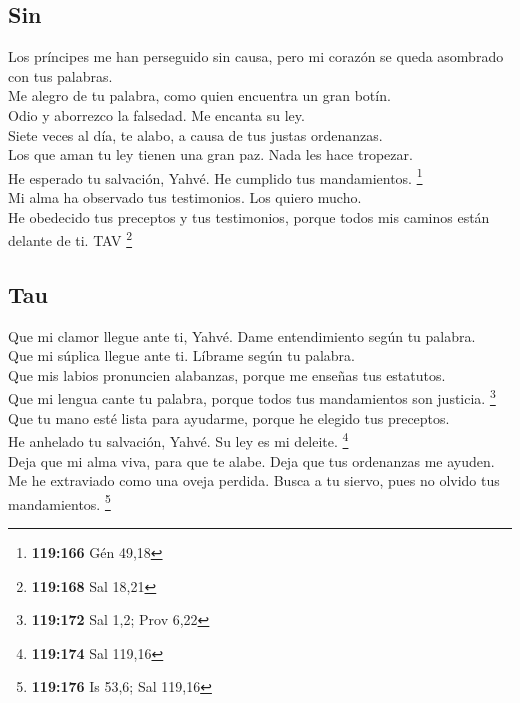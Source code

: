 \hypertarget{sin}{%
\subsection{Sin}\label{sin}}

 Los príncipes me han perseguido sin causa, pero mi
corazón se queda asombrado con tus palabras.\\
 Me alegro de tu palabra, como quien encuentra un gran
botín.\\
 Odio y aborrezco la falsedad. Me encanta su ley.\\
 Siete veces al día, te alabo, a causa de tus justas
ordenanzas.\\
 Los que aman tu ley tienen una gran paz. Nada les hace
tropezar.\\
 He esperado tu salvación, Yahvé. He cumplido tus
mandamientos. \footnote{\textbf{119:166} Gén 49,18}\\
 Mi alma ha observado tus testimonios. Los quiero
mucho.\\
 He obedecido tus preceptos y tus testimonios, porque
todos mis caminos están delante de ti. TAV \footnote{\textbf{119:168}
  Sal 18,21}

\hypertarget{tau}{%
\subsection{Tau}\label{tau}}

 Que mi clamor llegue ante ti, Yahvé. Dame entendimiento
según tu palabra.\\
 Que mi súplica llegue ante ti. Líbrame según tu
palabra.\\
 Que mis labios pronuncien alabanzas, porque me enseñas
tus estatutos.\\
 Que mi lengua cante tu palabra, porque todos tus
mandamientos son justicia. \footnote{\textbf{119:172} Sal 1,2; Prov 6,22}\\
 Que tu mano esté lista para ayudarme, porque he elegido
tus preceptos.\\
 He anhelado tu salvación, Yahvé. Su ley es mi deleite.
\footnote{\textbf{119:174} Sal 119,16}\\
 Deja que mi alma viva, para que te alabe. Deja que tus
ordenanzas me ayuden.\\
 Me he extraviado como una oveja perdida. Busca a tu
siervo, pues no olvido tus mandamientos. \footnote{\textbf{119:176} Is
  53,6; Sal 119,16}


